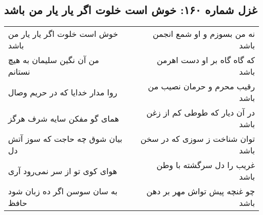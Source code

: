\begin{center}
\section*{غزل شماره ۱۶۰: خوش است خلوت اگر یار یار من باشد}
\label{sec:sh160}
\begin{longtable}{l p{0.5cm} r}
خوش است خلوت اگر یار یار من باشد
&&
نه من بسوزم و او شمع انجمن باشد
\\
من آن نگین سلیمان به هیچ نستانم
&&
که گاه گاه بر او دست اهرمن باشد
\\
روا مدار خدایا که در حریم وصال
&&
رقیب محرم و حرمان نصیب من باشد
\\
همای گو مفکن سایه شرف هرگز
&&
در آن دیار که طوطی کم از زغن باشد
\\
بیان شوق چه حاجت که سوز آتش دل
&&
توان شناخت ز سوزی که در سخن باشد
\\
هوای کوی تو از سر نمی‌رود آری
&&
غریب را دل سرگشته با وطن باشد
\\
به سان سوسن اگر ده زبان شود حافظ
&&
چو غنچه پیش تواش مهر بر دهن باشد
\\
\end{longtable}
\end{center}
